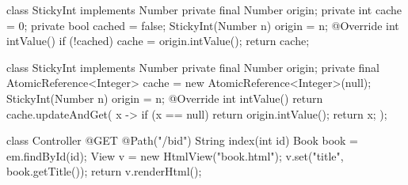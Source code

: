 \documentclass{article}
\begin{document}
\begin{lnSnippet}
class StickyInt implements Number {
  private final Number origin;
  private int cache = 0;
  private bool cached = false;
  StickyInt(Number n) { origin = n; }
  @Override int intValue() {
    if (!cached) {
      cache = origin.intValue();
    }
    return cache;
  }
}
\end{lnSnippet}
\begin{lnSnippet}
class StickyInt implements Number {
  private final Number origin;
  private final AtomicReference<Integer> cache =
    new AtomicReference<Integer>(null);
  StickyInt(Number n) { origin = n; }
  @Override int intValue() {
    return cache.updateAndGet(
      x -> {
        if (x == null) {
          return origin.intValue();
        }
        return x;
      }
    );
  }
}
\end{lnSnippet}


\begin{lnSnippet}
class Controller {
  @GET
  @Path("/b{id}")
  String index(int id) {
    Book book = em.findById(id);
    View v = new HtmlView("book.html");
    v.set("title", book.getTitle());
    return v.renderHtml();
  }
}
\end{lnSnippet}
\end{document}
